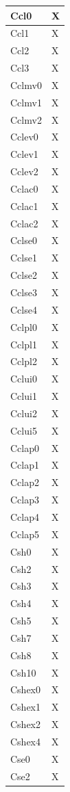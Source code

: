 \begin{footnotesize}
\begin{longtable}{|p{}|p{}|}
Ccl0 &X\\\hline 
Ccl1 &X\\\hline 
Ccl2 &X\\\hline 
Ccl3 &X\\\hline 
Cclmv0 &X\\\hline 
Cclmv1 &X\\\hline 
Cclmv2 &X\\\hline 
Cclev0 &X\\\hline
Cclev1 &X\\\hline 
Cclev2 &X\\\hline 
Cclac0 &X\\\hline 
Cclac1 &X\\\hline 
Cclac2 &X\\\hline 
Cclse0 &X\\\hline 
Cclse1 &X\\\hline 
Cclse2 &X\\\hline 
Cclse3 &X\\\hline 
Cclse4 &X\\\hline 
Cclpl0 &X\\\hline 
Cclpl1 &X\\\hline 
Cclpl2 &X\\\hline 
Cclui0 &X\\\hline 
Cclui1 &X\\\hline 
Cclui2 &X\\\hline
Cclui5 &X\\\hline  
Cclap0  &X\\\hline 
Cclap1 &X\\\hline 
Cclap2  &X\\\hline 
Cclap3 &X \\\hline 
Cclap4 &X \\\hline 
Cclap5 &X \\\hline 
Csh0 &X\\\hline 
Csh2 &X\\\hline 
Csh3 &X\\\hline 
Csh4 &X\\\hline 
Csh5 &X\\\hline 
Csh7 &X\\\hline 
Csh8 &X\\\hline 
Csh10 &X\\\hline 
Cshex0 &X\\\hline 
Cshex1 &X\\\hline 
Cshex2 &X\\\hline 
Cshex4 &X\\\hline 
Cse0 &X\\\hline 
Cse2 &X\\\hline 

\end{longtable}
\end{footnotesize}
